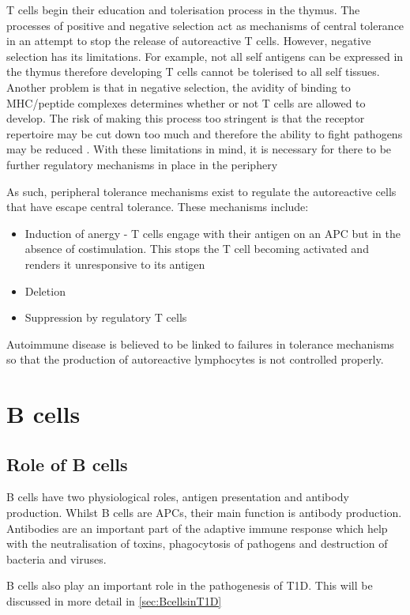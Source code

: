 T cells begin their education and tolerisation process in the thymus.
The processes of positive and negative selection act as mechanisms of central tolerance in an attempt to stop the release of autoreactive T cells\citep{Walker2002}.
However, negative selection has its limitations.
For example, not all self antigens can be expressed in the thymus therefore developing T cells cannot be tolerised to all self tissues.
Another problem is that in negative selection, the avidity of binding to MHC/peptide complexes determines whether or not T cells are allowed to develop.
The risk of making this process too stringent is that the receptor repertoire may be cut down too much and therefore the ability to fight pathogens may be reduced \citep{Walker2002}.
With these limitations in mind, it is necessary for there to be further regulatory mechanisms in place in the periphery

As such, peripheral tolerance mechanisms exist to regulate the autoreactive cells that have escape central tolerance.
These mechanisms include:
\begin{itemize}
\item Induction of anergy - T cells engage with their antigen on an APC but in the absence of costimulation. This stops the T cell becoming activated and renders it unresponsive to its antigen\citep{Abbas2004}
\item Deletion\citep{Abbas2004}
\item Suppression by regulatory T cells\citep{Abbas2004}
\end{itemize}

Autoimmune disease is believed to be linked to failures in tolerance mechanisms so that the production of autoreactive lymphocytes is not controlled properly.

\section{B cells}
\subsection{Role of B cells}
\label{subsec:Bcellrole}
B cells have two physiological roles, antigen presentation and antibody production.
Whilst B cells are APCs, their main function is antibody production.
Antibodies are an important part of the adaptive immune response which help with the neutralisation of toxins, phagocytosis of pathogens and destruction of bacteria and viruses.

B cells also play an important role in the pathogenesis of T1D. 
This will be discussed in more detail in \cref{sec:BcellsinT1D}

